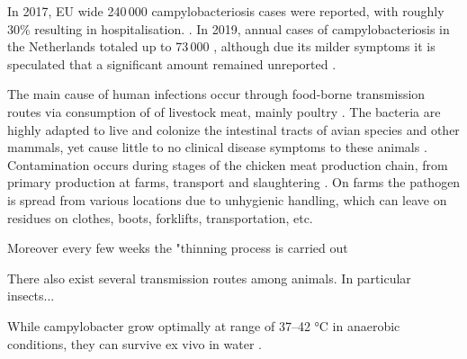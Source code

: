 {In 2017, EU wide 240\,000 campylobacteriosis cases were reported, with roughly 30\%  resulting in hospitalisation. \parencite{european_centre_for_disease_prevention_and_control_european_2018}. In 2019, annual cases of campylobacteriosis in the Netherlands totaled up to 73\,000 \parencite{lagerweij_disease_2020}, although due its milder symptoms it is speculated that a significant amount remained unreported \parencite{koutsoumanis_update_2020}. 



The main cause of human infections occur through food-borne transmission routes via consumption of of livestock meat, mainly poultry \parencite{wilson_tracing_2008}. The bacteria are highly adapted to live and colonize the intestinal tracts of avian species and other mammals, yet cause little to no clinical disease symptoms to these animals \parencite{saif_diseases_2008}. Contamination occurs during stages of the chicken meat production chain, from primary production at farms, transport and slaughtering \parencite{skarp_campylobacteriosis_2015}. 
On farms the pathogen is spread from various locations due to unhygienic handling, which can leave on residues on
clothes, boots, forklifts, transportation, etc. 

Moreover every few weeks the "thinning process is carried out

There also exist several transmission routes among animals. In particular insects...

While campylobacter grow optimally at range of 37–42 °C \cite{bronowski_role_2014} in anaerobic conditions, they can survive ex vivo in water \cite{wilson_tracing_2008}. 

}

